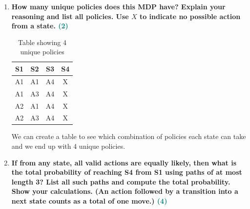\documentclass[a4paper]{article}
\begin{document}
\begin{sloppypar}
\begin{enumerate}[start=8,label=Q\arabic*,left=0pt]
    \item \textbf{How many unique policies does this MDP have? Explain your reasoning and list all policies. Use $X$ to indicate no possible action from a state. \hfill \textcolor{teal}{(2)}}
    
    \begin{table}[h!]
    \centering
    \begin{tabular}{ |c|c|c|c| } 
        \hline
        S1 & S2 & S3 & S4 \\
        \hline
        A1 & A1 & A4 & X \\ 
        A1 & A3 & A4 & X \\ 
        A2 & A1 & A4 & X \\ 
        A2 & A3 & A4 & X \\ 
        \hline
    \end{tabular}
    \caption{Table showing 4 unique policies}
    \label{table:1}
    \end{table}

    We can create a table to see which combination of policies each state can take and we end up
    with 4 unique policies.
    
    \item \textbf{If from any state, all valid actions are equally likely, then what is the total probability
    of reaching S4 from S1 using paths of at most length 3? List all such paths and compute
    the total probability. Show your calculations. (An action followed by a transition into a next
    state counts as a total of one move.) \hfill \textcolor{teal}{(4)}}
    

\end{enumerate}
\end{sloppypar}
\end{document}
